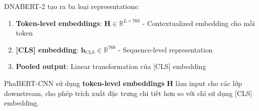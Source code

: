 DNABERT-2 tạo ra ba loại representations:

\begin{enumerate}
    \item \textbf{Token-level embeddings}: $\mathbf{H} \in \mathbb{R}^{L \times 768}$ - Contextualized embedding cho mỗi token
    \item \textbf{[CLS] embedding}: $\mathbf{h}_{\text{CLS}} \in \mathbb{R}^{768}$ - Sequence-level representation
    \item \textbf{Pooled output}: Linear transformation của [CLS] embedding
\end{enumerate}

PhaBERT-CNN sử dụng \textbf{token-level embeddings} $\mathbf{H}$ làm input cho các lớp downstream, cho phép trích xuất đặc trưng chi tiết hơn so với chỉ sử dụng [CLS] embedding.
